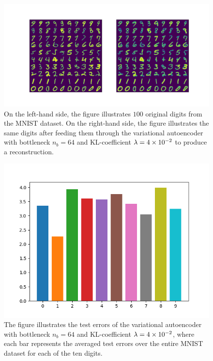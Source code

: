 \begin{figure}
\begin{center}
      \includegraphics[trim = 15mm 10mm 15mm 15mm, clip, width=\linewidth]{convolutional_VAE_snd_KL_4e-2_10k_epochs_64D_inference}
\end{center}
\caption{On the left-hand side, the figure illustrates $100$ original digits from the MNIST dataset. On the right-hand side, the figure illustrates the same digits after feeding them through the variational autoencoder with bottleneck $n_b=64$ and KL-coefficient $\lambda=\num{4e-2}$ to produce a reconstruction.}\label{fig:convolutional_VAE_snd_KL_4e-2_10k_epochs_64D_inference}
\end{figure}

\begin{figure}
\begin{center}
      \includegraphics[width=0.49\linewidth]{convolutional_VAE_snd_KL_4e-2_10k_epochs_64D_errors}
\end{center}
\caption{The figure illustrates the test errors of the variational autoencoder with bottleneck $n_b=64$ and KL-coefficient $\lambda = \num{4e-2}$, where each bar represents the averaged test errors over the entire MNIST dataset for each of the ten digits.}\label{fig:convolutional_VAE_snd_KL_4e-2_10k_epochs_64D_errors}
\end{figure}

